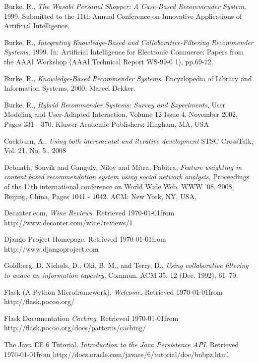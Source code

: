 \begin{thebibliography}{9}

     Burke, R., \emph{The Wasabi Personal Shopper: A Case-Based Recommender System}, 1999. Submitted to the 11th Annual Conference on Innovative Applications of Artificial Intelligence.

     Burke, R., \emph{Integrating Knowledge-Based and Collaborative-Filtering Recommender Systems}, 1999. In: Artificial Intelligence for Electronic Commerce: Papers from the AAAI Workshop (AAAI Technical Report WS-99-0 1), pp.69-72.

     Burke, R., \emph{Knowledge-Based Recommender Systems}, Encyclopedia of Library and Information Systems, 2000. Marcel Dekker.

     Burke, R., \emph{Hybrid Recommender Systems: Survey and Experiments}, User Modeling and User-Adapted Interaction, Volume 12 Issue 4, November 2002, Pages 331 - 370. Kluwer Academic Publishers: Hingham, MA, USA

     Cockburn, A., \emph{Using both incremental and iterative development} STSC CrossTalk, Vol. 21, No. 5., 2008

     Debnath, Souvik and Ganguly, Niloy and Mitra, Pabitra, \emph{
        Feature weighting in content based recommendation system using social network analysis}, Proceedings of the 17th international conference on World Wide Web, WWW '08, 2008, Beijing, China, Pages 1041 - 1042. ACM: New York, NY, USA,

     Decanter.com, \emph{Wine Reviews}. Retrieved \today from http://www.decanter.com/wine/reviews/1

     Django Project Homepage. Retrieved \today from http://www.djangoproject.com

     Goldberg, D. Nichols, D., Oki, B. M., and Terry, D., \emph{Using collaborative filtering to weave an information tapestry}, Commun. ACM 35, 12 (Dec. 1992), 61--70.

     Flask (A Python Microframework), \emph{Welcome}. Retrieved \today from http://flask.pocoo.org/

     Flask Documentation \emph{Caching}. Retrieved \today from http://flask.pocoo.org/docs/patterns/caching/

     The Java EE 6 Tutorial, \emph{Introduction to the Java Persistence API}. Retrieved \today from http://docs.oracle.com/javaee/6/tutorial/doc/bnbpz.html


\end{thebibliography}
